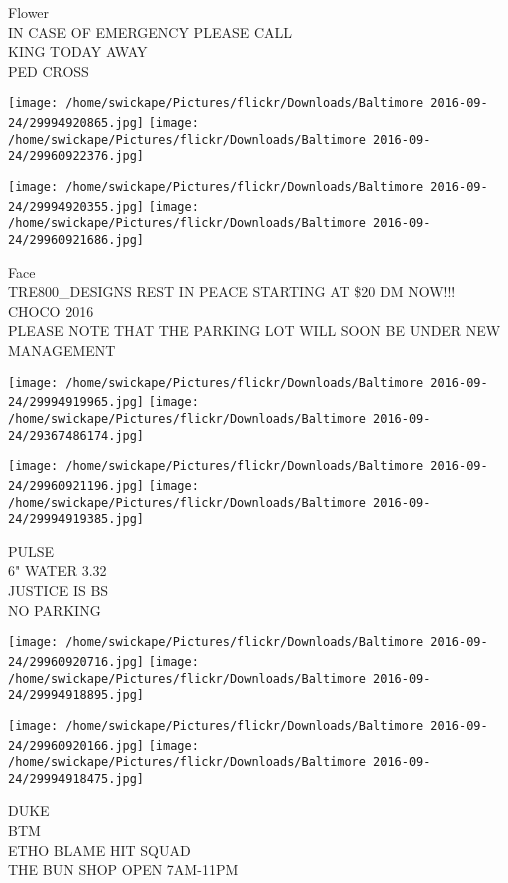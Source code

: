 \documentclass[10pt,letterpaper]{article}
\begin{document}
Flower\\
IN CASE OF EMERGENCY PLEASE CALL\\
KING TODAY AWAY\\
PED CROSS
\pagebreak

\texttt{[image: /home/swickape/Pictures/flickr/Downloads/Baltimore 2016-09-24/29994920865.jpg]}
\texttt{[image: /home/swickape/Pictures/flickr/Downloads/Baltimore 2016-09-24/29960922376.jpg]}

\texttt{[image: /home/swickape/Pictures/flickr/Downloads/Baltimore 2016-09-24/29994920355.jpg]}
\texttt{[image: /home/swickape/Pictures/flickr/Downloads/Baltimore 2016-09-24/29960921686.jpg]}

Face\\
TRE800\_DESIGNS REST IN PEACE STARTING AT \$20 DM NOW!!!\\
CHOCO 2016\\
PLEASE NOTE THAT THE PARKING LOT WILL SOON BE UNDER NEW MANAGEMENT
\pagebreak

\texttt{[image: /home/swickape/Pictures/flickr/Downloads/Baltimore 2016-09-24/29994919965.jpg]}
\texttt{[image: /home/swickape/Pictures/flickr/Downloads/Baltimore 2016-09-24/29367486174.jpg]}

\texttt{[image: /home/swickape/Pictures/flickr/Downloads/Baltimore 2016-09-24/29960921196.jpg]}
\texttt{[image: /home/swickape/Pictures/flickr/Downloads/Baltimore 2016-09-24/29994919385.jpg]}

PULSE\\
6" WATER 3.32\\
JUSTICE IS BS\\
NO PARKING
\pagebreak

\texttt{[image: /home/swickape/Pictures/flickr/Downloads/Baltimore 2016-09-24/29960920716.jpg]}
\texttt{[image: /home/swickape/Pictures/flickr/Downloads/Baltimore 2016-09-24/29994918895.jpg]}

\texttt{[image: /home/swickape/Pictures/flickr/Downloads/Baltimore 2016-09-24/29960920166.jpg]}
\texttt{[image: /home/swickape/Pictures/flickr/Downloads/Baltimore 2016-09-24/29994918475.jpg]}

DUKE\\
BTM\\
ETHO BLAME HIT SQUAD\\
THE BUN SHOP OPEN 7AM{-}11PM
\pagebreak
\end{document}
